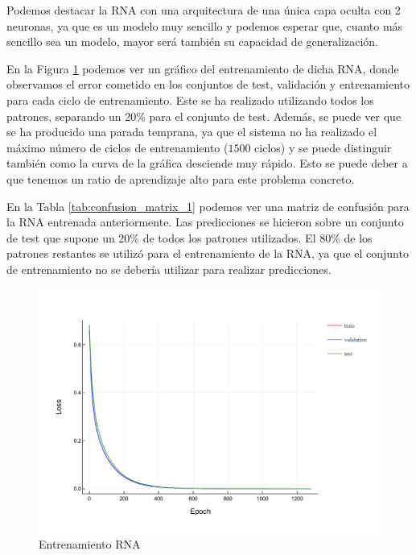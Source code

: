 \documentclass[12pt]{article}
\begin{document}
Podemos destacar la RNA con una arquitectura de una única capa oculta con 2 neuronas, ya que es un modelo muy sencillo y podemos esperar que, cuanto
más sencillo sea un modelo, mayor será también su capacidad de generalización. 

\bigskip
En la Figura \ref{fig:rna_train_1} podemos ver un gráfico del entrenamiento de dicha RNA, donde observamos el error
cometido en los conjuntos de test, validación y entrenamiento para cada ciclo de entrenamiento. Este se ha realizado
utilizando todos los patrones, separando un 20\% para el conjunto de test.
Además, se puede ver que se ha producido una parada temprana, ya que el sistema no ha realizado
el máximo número de ciclos de entrenamiento ($1500$ ciclos) y se puede distinguir también como la curva de la gráfica desciende muy rápido. 
Esto se puede deber a que tenemos un ratio de aprendizaje alto para este problema concreto.

\bigskip
En la Tabla \ref{tab:confusion_matrix_1} podemos ver una matriz de confusión para la RNA entrenada anteriormente. Las predicciones se hicieron sobre un conjunto
de test que supone un 20\% de todos los patrones utilizados. El 80\% de los patrones restantes se utilizó para el entrenamiento de la RNA,
ya que el conjunto de entrenamiento no se debería utilizar para realizar predicciones.

\begin{figure}[!ht]
	\centering
	\includegraphics[width=1.0\linewidth]{assets/best_rna_train_1.pdf}
	\caption{Entrenamiento RNA}
	\label{fig:rna_train_1}
\end{figure}
\end{document}

